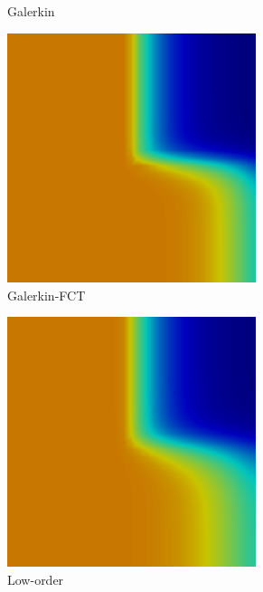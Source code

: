 \documentclass{beamer} \useoutertheme{infolines}
\begin{document}
\begin{frame}
\begin{figure}[h]
\begin{subfigure}{0.3\textwidth}
      \caption{Galerkin}
   \end{subfigure}
   \begin{subfigure}{0.3\textwidth}
      \includegraphics[width=0.8\textwidth]{./figures/GalFCT.png}
      \caption{Galerkin-FCT}
   \end{subfigure}
   \begin{subfigure}{0.3\textwidth}
      \includegraphics[width=0.8\textwidth]{./figures/low.png}
      \caption{Low-order}
   \end{subfigure}
   \begin{subfigure}{0.3\textwidth}

\end{subfigure}
\end{figure}
\end{frame}
\end{document}
